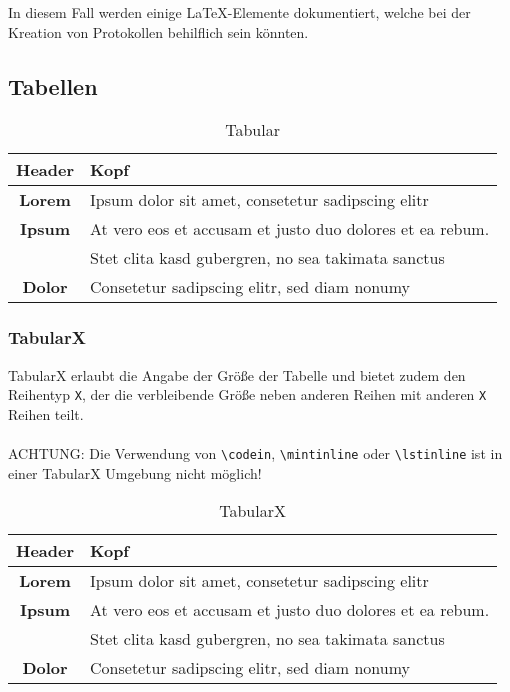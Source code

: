 In diesem Fall werden einige \LaTeX-Elemente dokumentiert, welche bei der Kreation von Protokollen behilflich sein könnten.

\subsection{Tabellen}
\begin{table}[H]
	\center
	\begin{tabular}{| c | l |}
		\hline Header 	& Kopf\\ \hline\hline
		\textbf{Lorem} 	& Ipsum dolor sit amet, consetetur sadipscing elitr\\ \hline
		\textbf{Ipsum} 	& At vero eos et accusam et justo duo dolores et ea rebum.\\
						& Stet clita kasd gubergren, no sea takimata sanctus\\ \hline
		\textbf{Dolor} 	& Consetetur sadipscing elitr, sed diam nonumy\\\hline
	\end{tabular}
	\caption{Tabular}
	\label{tab:tabular}
\end{table}

\subsubsection{TabularX}
TabularX erlaubt die Angabe der Größe der Tabelle und bietet zudem den Reihentyp \texttt{X}, der die verbleibende Größe neben anderen Reihen mit anderen \texttt{X} Reihen teilt.
\\\\
ACHTUNG: Die Verwendung von \verb|\codein|, \verb|\mintinline| oder \verb|\lstinline| ist in einer TabularX Umgebung nicht möglich!
\begin{table}
    \center
    \begin{tabularx}{\textwidth}{| c | X |}
        \hline Header 	& Kopf\\ \hline\hline
        \textbf{Lorem} 	& Ipsum dolor sit amet, consetetur sadipscing elitr\\ \hline
        \textbf{Ipsum} 	& At vero eos et accusam et justo duo dolores et ea rebum.\\
            			& Stet clita kasd gubergren, no sea takimata sanctus\\ \hline
        \textbf{Dolor} 	& Consetetur sadipscing elitr, sed diam nonumy\\\hline
    \end{tabularx}
    \caption{TabularX}
    \label{tab:tabularx}
\end{table}

